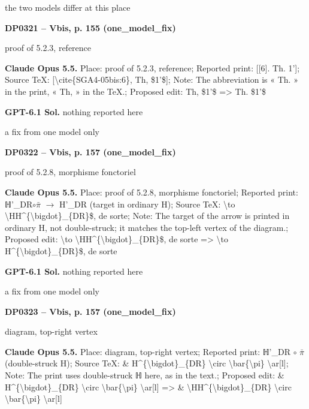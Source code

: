 the two models differ at this place\par
\par\noindent\hypertarget{DP0321}{}\textbf{DP0321 -- Vbis, p. 155 (one\_model\_fix)}\par
proof of 5.2.3, reference\par
\textbf{Claude Opus 5.5.} Place: proof of 5.2.3, reference; Reported print: [[6]. Th. 1']; Source TeX: [\textbackslash{}cite\{SGA4-05bis:6\}, Th, \$1'\$]; Note: The abbreviation is « Th. » in the print, « Th, » in the TeX.; Proposed edit: Th, \$1'\$ =\allowbreak > Th. \$1'\$\par
\textbf{GPT-6.1 Sol.} nothing reported here\par
a fix from one model only\par
\par\noindent\hypertarget{DP0322}{}\textbf{DP0322 -- Vbis, p. 157 (one\_model\_fix)}\par
proof of 5.2.8, morphisme fonctoriel\par
\textbf{Claude Opus 5.5.} Place: proof of 5.2.8, morphisme fonctoriel; Reported print: ℍ'\_DR\ensuremath{\circ}\ensuremath{\bar{\pi}} \ensuremath{\longrightarrow} H'\_DR (target in ordinary H); Source TeX: \textbackslash{}to \textbackslash{}HH\textasciicircum{}\{\textbackslash{}bigdot\}\_\{DR\}\$, de sorte; Note: The target of the arrow is printed in ordinary H, not double-struck; it matches the top-left vertex of the diagram.; Proposed edit: \textbackslash{}to \textbackslash{}HH\textasciicircum{}\{\textbackslash{}bigdot\}\_\{DR\}\$, de sorte =\allowbreak > \textbackslash{}to H\textasciicircum{}\{\textbackslash{}bigdot\}\_\{DR\}\$, de sorte\par
\textbf{GPT-6.1 Sol.} nothing reported here\par
a fix from one model only\par
\par\noindent\hypertarget{DP0323}{}\textbf{DP0323 -- Vbis, p. 157 (one\_model\_fix)}\par
diagram, top-right vertex\par
\textbf{Claude Opus 5.5.} Place: diagram, top-right vertex; Reported print: ℍ'\_DR \ensuremath{\circ} \ensuremath{\bar{\pi}} (double-struck H); Source TeX: \& H\textasciicircum{}\{\textbackslash{}bigdot\}\_\{DR\} \textbackslash{}circ \textbackslash{}bar\{\textbackslash{}pi\} \textbackslash{}ar[l]; Note: The print uses double-struck ℍ here, as in the text.; Proposed edit: \& H\textasciicircum{}\{\textbackslash{}bigdot\}\_\{DR\} \textbackslash{}circ \textbackslash{}bar\{\textbackslash{}pi\} \textbackslash{}ar[l] =\allowbreak > \& \textbackslash{}HH\textasciicircum{}\{\textbackslash{}bigdot\}\_\{DR\} \textbackslash{}circ \textbackslash{}bar\{\textbackslash{}pi\} \textbackslash{}ar[l]\par
